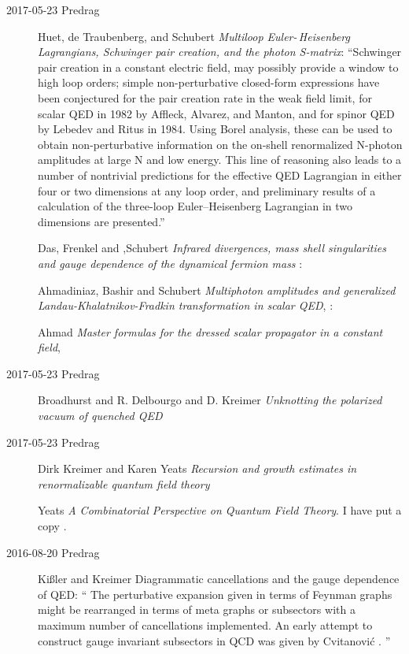 \begin{description}
\item[2017-05-23 Predrag]
Huet, de Traubenberg, and Schubert
{\em Multiloop {Euler-\,Heisenberg Lagrangians, Schwinger} pair creation,
and the photon {S-matrix}}:
``Schwinger pair creation in a constant electric field, may possibly
provide a window to high loop orders; simple non-perturbative closed-form
expressions have been conjectured for the pair creation rate in the weak
field limit, for scalar QED in 1982 by Affleck, Alvarez, and
Manton, and for spinor QED by Lebedev and
Ritus in 1984. Using Borel analysis, these can be used to
obtain non-perturbative information on the on-shell renormalized N-photon
amplitudes at large N and low energy. This line of reasoning also leads
to a number of nontrivial predictions for the effective QED Lagrangian in
either four or two dimensions at any loop order, and preliminary results
of a calculation of the three-loop Euler--Heisenberg Lagrangian in two
dimensions are presented.''

Das, Frenkel and ,Schubert
{\em Infrared divergences, mass shell singularities and gauge dependence
of the dynamical fermion mass} :

Ahmadiniaz, Bashir and Schubert
{\em Multiphoton amplitudes and generalized {Landau-Khalatnikov-Fradkin}
transformation in scalar {QED}},  	:

Ahmad \etal{}
{\em Master formulas for the dressed scalar propagator in a constant field},


\item[2017-05-23 Predrag]
Broadhurst and R. Delbourgo and D. Kreimer
{\em Unknotting the polarized vacuum of quenched {QED}}

\item[2017-05-23 Predrag]
Dirk Kreimer and
{Karen Yeats}
{\em Recursion and growth estimates in renormalizable quantum field theory}

Yeats {\em {A Combinatorial Perspective on Quantum Field Theory}}.
I have put a copy .

\item[2016-08-20 Predrag]
Ki{\ss}ler and Kreimer
{Diagrammatic cancellations and the gauge dependence of {QED}}:
``
The perturbative expansion given in terms of Feynman graphs might be
rearranged in terms of meta graphs or subsectors with a maximum number of
cancellations implemented. An early attempt to construct gauge invariant
subsectors in QCD was given by Cvitanovi\'c \etal{}.
''


\end{description}
